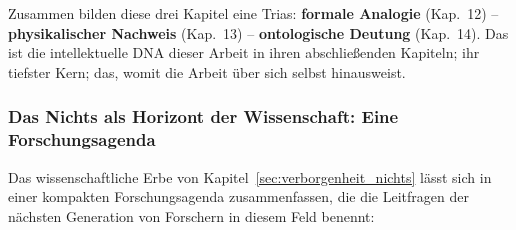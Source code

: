 ﻿\documentclass[12pt,a4paper]{report}
\begin{document}
Zusammen bilden diese drei Kapitel eine Trias: \textbf{formale Analogie} (Kap.~12) -- \textbf{physikalischer Nachweis} (Kap.~13) -- \textbf{ontologische Deutung} (Kap.~14). Das ist die intellektuelle DNA dieser Arbeit in ihren abschließenden Kapiteln; ihr tiefster Kern; das, womit die Arbeit über sich selbst hinausweist.

\subsubsection{Das Nichts als Horizont der Wissenschaft: Eine Forschungsagenda}

Das wissenschaftliche Erbe von Kapitel~\ref{sec:verborgenheit_nichts} lässt sich in einer kompakten Forschungsagenda zusammenfassen, die die Leitfragen der nächsten Generation von Forschern in diesem Feld benennt:
\end{document}
